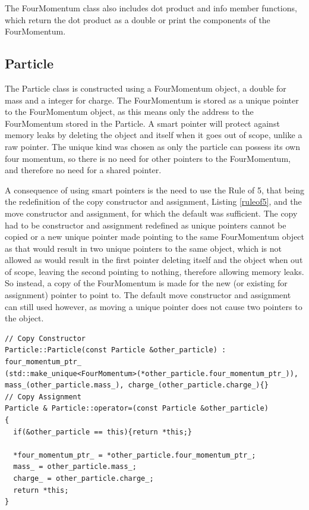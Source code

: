 \documentclass[11pt]{article} %
\begin{document}
The FourMomentum class also includes dot product and info member functions, which return the dot product as a double or print the components of the FourMomentum. 
\subsection{Particle}
The Particle class is constructed using a FourMomentum object, a double for mass and a integer for charge. The FourMomentum is stored as a unique pointer to the FourMomentum object, as this means only the address to the FourMomentum stored in the Particle. A smart pointer will protect against memory leaks by deleting the object and itself when it goes out of scope, unlike a raw pointer. The unique kind was chosen as only the particle can possess its own four momentum, so there is no need for other pointers to the FourMomentum, and therefore no need for a shared pointer. 

A consequence of using smart pointers is the need to use the Rule of 5, that being the redefinition of the copy constructor and assignment, Listing 
\ref{ruleof5}, and the move constructor and assignment, for which the default was sufficient. The copy  had to be constructor and assignment redefined as unique pointers cannot be copied or a new unique pointer made pointing to the same FourMomentum object as that would result in two unique pointers to the same object, which is not allowed as would result in the first pointer deleting itself and the object when out of scope, leaving the second pointing to nothing, therefore allowing memory leaks. So instead, a copy of the FourMomentum is made for the new (or existing for assignment) pointer to point to. The default move constructor and assignment can still used however, as moving a unique pointer does not cause two pointers to the object. 

\begin{lstlisting}[firstnumber=16, caption={Code snippet from Particle.cpp showing the copy constructor and assignment redefinition in the Particle class.}, label=ruleof5]
// Copy Constructor
Particle::Particle(const Particle &other_particle) : four_momentum_ptr_ 
(std::make_unique<FourMomentum>(*other_particle.four_momentum_ptr_)),
mass_(other_particle.mass_), charge_(other_particle.charge_){}
// Copy Assignment
Particle & Particle::operator=(const Particle &other_particle)
{
  if(&other_particle == this){return *this;}

  *four_momentum_ptr_ = *other_particle.four_momentum_ptr_;
  mass_ = other_particle.mass_;
  charge_ = other_particle.charge_;
  return *this;
}
\end{lstlisting} 
\end{document}

